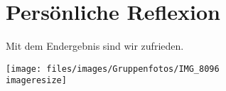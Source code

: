 \chapter{Persönliche Reflexion}
\label{sec:reflexion}

Mit dem Endergebnis sind wir zufrieden.

\begin{figurewrapper}
	\texttt{[image: files/images/Gruppenfotos/IMG\_8096\\imageresize]}
	\label{fig:group_picture}
\end{figurewrapper}
